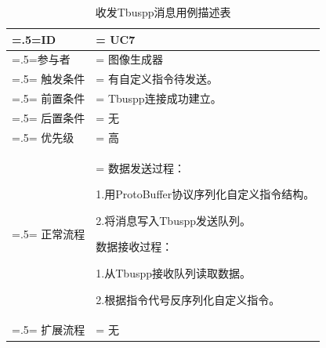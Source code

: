\begin{table}[htbp]
    \begin{center}
        \caption{收发Tbuspp消息用例描述表}
        \label{usecase7}
        \renewcommand\arraystretch{1.5}
        \begin{tabularx}{0.8\textwidth}{ 
            | >{\centering\arraybackslash\hsize=.5\hsize\linewidth=\hsize}X 
            | >{\raggedright\arraybackslash\hsize=1.5\hsize\linewidth=\hsize}X 
            | }
            \hline
            \textbf{ID} & \textbf{UC7}\\
            \hline
            参与者 & 图像生成器\\
            \hline
            触发条件 & 有自定义指令待发送。\\
            \hline
            前置条件 & Tbuspp连接成功建立。\\
            \hline
            后置条件 & 无\\
            \hline
            优先级 & 高\\
            \hline
            正常流程 &  数据发送过程：\par 1.用ProtoBuffer协议序列化自定义指令结构。\par 2.将消息写入Tbuspp发送队列。\par 
                       数据接收过程：\par 1.从Tbuspp接收队列读取数据。\par   2.根据指令代号反序列化自定义指令。\\
            \hline
            扩展流程 & 无\\
            \hline
        \end{tabularx}
    \end{center}
\end{table}






